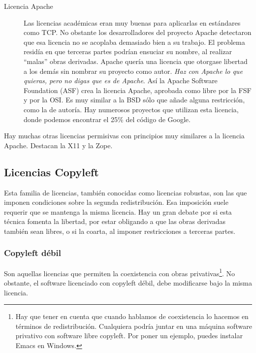 \begin{description}
  \item[Licencia Apache] Las licencias académicas eran muy buenas para
    aplicarlas en estándares como TCP. No obstante los desarrolladores
    del proyecto Apache detectaron que esa licencia no se acoplaba
    demasiado bien a su trabajo. El problema residía en que terceras
    partes podrían ensuciar su nombre, al realizar ``malas'' obras
    derivadas. Apache quería una licencia que otorgase libertad a los
    demás sin nombrar su proyecto como autor. \emph{Haz con Apache lo
      que quieras, pero no digas que es de Apache}. Así la Apache
    Software Foundation (ASF) crea la licencia Apache, aprobada como
    libre por la FSF y por la OSI. Es muy similar a la BSD sólo que
    añade alguna restricción, como la de autoría. Hay numerosos
    proyectos que utilizan esta licencia, donde podemos encontrar el
    25\% del código de Google.
\end{description}

Hay muchas otras licencias permisivas con principios muy similares a
la licencia Apache. Destacan la X11 y la Zope.

\subsection{Licencias Copyleft}

Esta familia de licencias, también conocidas como licencias robustas,
son las que imponen condiciones sobre la segunda redistribución. Esa
imposición suele requerir que se mantenga la misma licencia. Hay un
gran debate por si esta técnica fomenta la libertad, por estar
obligando a que las obras derivadas también sean libres, o si la
coarta, al imponer restricciones a terceras partes.

\subsubsection{Copyleft débil}

Son aquellas licencias que permiten la coexistencia con obras
privativas\footnote{Hay que tener en cuenta que cuando hablamos de
  coexistencia lo hacemos en términos de redistribución. Cualquiera
  podría juntar en una máquina software privativo con software libre
  copyleft. Por poner un ejemplo, puedes instalar Emacs en
  Windows.}. No obstante, el software licenciado con copyleft débil,
debe modificarse bajo la misma licencia.

